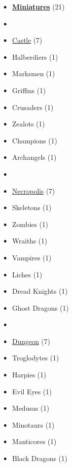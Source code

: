 
\begin{multicols*}{2}

\small

\begin{itemize}[leftmargin=0pt, label={}, noitemsep, noitemsep]
  \item \textbf{\underline{Miniatures}} (21)
  \item
  \item \underline{Castle} (7)
  \item Halberdiers (1)
  \item Marksmen (1)
  \item Griffins (1)
  \item Crusaders (1)
  \item Zealots (1)
  \item Champions (1)
  \item Archangels (1)
  \item
  \item \underline{Necropolis} (7)
  \item Skeletons (1)
  \item Zombies (1)
  \item Wraiths (1)
  \item Vampires (1)
  \item Liches (1)
  \item Dread Knights (1)
  \item Ghost Dragons (1)
  \item
  \item \underline{Dungeon} (7)
  \item Troglodytes (1)
  \item Harpies (1)
  \item Evil Eyes (1)
  \item Medusas (1)
  \item Minotaurs (1)
  \item Manticores (1)
  \item Black Dragons (1)
\end{itemize}

\end{multicols*}

